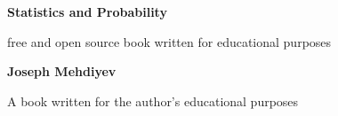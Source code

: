 \begin{titlepage}
    \begin{center}
        \vspace*{1cm}
        \Huge
        \textbf{Statistics and Probability}
        
        \vspace*{0.5cm}
        \LARGE
        free and open source book written for educational purposes

        \vspace*{1.5cm}

        \textbf{Joseph Mehdiyev}

        \vfill

        A book written for the author's educational purposes
    \end{center}
\end{titlepage}